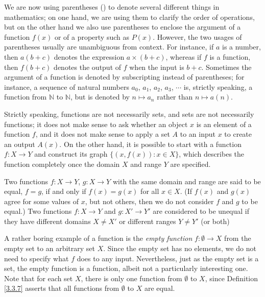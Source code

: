 \setcounter{theorem}{4}
\begin{remark}\label{3.3.5}
We are now using parentheses () to denote several different things in mathematics;
on one hand, we are using them to clarify the order of operations, but on the other hand we also use parentheses to enclose the argument of a function \(f(x)\) or of a property such as \(P(x)\).
However, the two usages of parentheses usually are unambiguous from context.
For instance, if \(a\) is a number, then \(a(b + c)\) denotes the expression \(a \times (b + c)\), whereas if \(f\) is a function, then \(f(b + c)\) denotes the output of \(f\) when the input is \(b + c\).
Sometimes the argument of a function is denoted by subscripting instead of parentheses;
for instance, a sequence of natural numbers \(a_0\), \(a_1\), \(a_2\), \(a_3\), \(\cdots\) is, strictly speaking, a function from \(\mathds{N}\) to \(\mathds{N}\), but is denoted by \(n \mapsto a_n\) rather than \(n \mapsto a(n)\).
\end{remark}

\begin{remark}\label{3.3.6}
Strictly speaking, functions are not necessarily sets, and sets are not necessarily functions;
it does not make sense to ask whether an object \(x\) is an element of a function \(f\), and it does not make sense to apply a set \(A\) to an input \(x\) to create an output \(A(x)\).
On the other hand, it is possible to start with a function \(f : X \to Y\) and construct its graph \(\{(x, f(x)) : x \in X\}\), which describes the function completely once the domain \(X\) and range \(Y\) are specified.
\end{remark}

\begin{definition}\label{3.3.7}
Two functions \(f : X \to Y\), \(g : X \to Y\) with the same domain and range are said to be equal, \(f = g\), if and only if \(f(x) = g(x)\) for all \(x \in X\).
(If \(f(x)\) and \(g(x)\) agree for some values of \(x\), but not others, then we do not consider \(f\) and \(g\) to be equal.)
Two functions \(f: X \to Y\) and \(g: X' \to Y'\) are considered to be unequal if they have different domains \(X \neq X'\) or different ranges \(Y \neq Y'\) (or both)
\end{definition}

\begin{note}
A rather boring example of a function is the \emph{empty function} \(f : \emptyset \to X\) from the empty set to an arbitrary set \(X\).
Since the empty set has no elements, we do not need to specify what \(f\) does to any input.
Nevertheless, just as the empty set is a set, the empty function is a function, albeit not a particularly interesting one.
Note that for each set \(X\), there is only one function from \(\emptyset\) to \(X\), since Definition \ref{3.3.7} asserts that all functions from \(\emptyset\) to \(X\) are equal.
\end{note}

